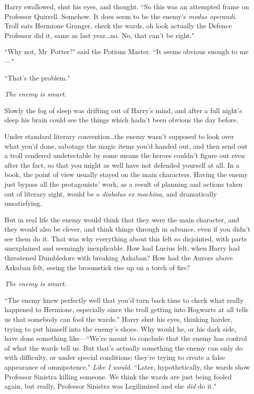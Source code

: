 Harry swallowed, shut his eyes, and thought. ``So this was an attempted frame on Professor Quirrell. Somehow. It does seem to be the enemy's \emph{modus operandi}. Troll eats Hermione Granger, check the wards, oh look actually the Defence Professor did it, same as last year…no. No, that can't be right."

``Why not, Mr~Potter?" said the Potions Master. ``It seems obvious enough to me—"

``That's the problem."

\emph{The enemy is smart.}

Slowly the fog of sleep was drifting out of Harry's mind, and after a full night's sleep his brain could see the things which hadn't been obvious the day before.

Under standard literary convention…the enemy wasn't supposed to look over what you'd done, sabotage the magic items you'd handed out, and then send out a troll rendered undetectable by some means the heroes couldn't figure out even after the fact, so that you might as well have not defended yourself at all. In a book, the point of view usually stayed on the main characters. Having the enemy just bypass all the protagonists' work, as a result of planning and actions taken out of literary sight, would be a \emph{diabolus ex machina}, and dramatically unsatisfying.

But in real life the enemy would think that they were the main character, and they would also be clever, and think things through in advance, even if you didn't see them do it. That was why everything about this felt so disjointed, with parts unexplained and seemingly inexplicable. How had Lucius felt, when Harry had threatened Dumbledore with breaking Azkaban? How had the Aurors above Azkaban felt, seeing the broomstick rise up on a torch of fire?

\emph{The enemy is smart.}

``The enemy knew perfectly well that you'd turn back time to check what really happened to Hermione, especially since the troll getting into Hogwarts at all tells us that somebody can fool the wards." Harry shut his eyes, thinking harder, trying to put himself into the enemy's shoes. Why would he, or his dark side, have done something like—``We're meant to conclude that the enemy has control of what the wards tell us. But that's actually something the enemy can only do with difficulty, or under special conditions; they're trying to create a false appearance of omnipotence." \emph{Like I would.} ``Later, hypothetically, the wards show Professor Sinistra killing someone. We think the wards are just being fooled again, but really, Professor Sinistra was Legilimized and she \emph{did} do it."

